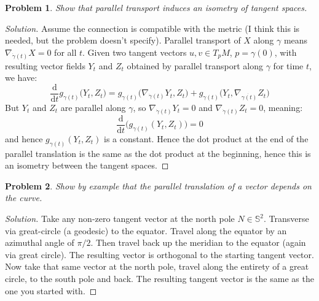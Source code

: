 \documentclass{article}
\theoremstyle{normal}
\newtheorem{problem}{Problem}
\begin{document}
    \begin{problem}
        Show that parallel transport induces an isometry of tangent spaces.
    \end{problem}
    \begin{proof}[Solution]
        Assume the connection is compatible with the metric (I think this is
        needed, but the problem doesn't specify). Parallel transport of
        $X$ along $\gamma$ means $\nabla_{\dot{\gamma}(t)}X=0$ for all $t$.
        Given two tangent vectors $u,v\in{T}_{p}M$, $p=\gamma(0)$, with
        resulting vector fields $Y_{t}$ and $Z_{t}$ obtained by parallel
        transport along $\gamma$ for time $t$, we have:
        \begin{equation}
            \frac{\textrm{d}}{\textrm{d}t}g_{\gamma(t)}\big(
                Y_{t},Z_{t}
            \big)=g_{\gamma(t)}\big(\nabla_{\dot{\gamma}(t)}Y_{t},Z_{t}\big)+
                g_{\gamma(t)}\big(Y_{t},\nabla_{\dot{\gamma(t)}}Z_{t}\big)
        \end{equation}
        But $Y_{t}$ and $Z_{t}$ are parallel along $\gamma$, so
        $\nabla_{\dot{\gamma}(t)}Y_{t}=0$ and
        $\nabla_{\dot{\gamma}(t)}Z_{t}=0$, meaning:
        \begin{equation}
            \frac{\textrm{d}}{\textrm{d}t}\Big(
                g_{\gamma(t)}(Y_{t},Z_{t})\Big)=0
        \end{equation}
        and hence $g_{\gamma(t)}(Y_{t},Z_{t})$ is a constant. Hence the dot
        product at the end of the parallel translation is the same as the dot
        product at the beginning, hence this is an isometry between the tangent
        spaces.
    \end{proof}
    \begin{problem}
        Show by example that the parallel translation of a vector depends on
        the curve.
    \end{problem}
    \begin{proof}[Solution]
        Take any non-zero tangent vector at the north pole $N\in\mathbb{S}^{2}$.
        Transverse via great-circle (a geodesic) to the equator. Travel along
        the equator by an azimuthal angle of $\pi/2$. Then travel back up the
        meridian to the equator (again via great circle). The resulting vector
        is orthogonal to the starting tangent vector. Now take that same vector
        at the north pole, travel along the entirety of a great circle, to the
        south pole and back. The resulting tangent vector is the same as the
        one you started with.
    \end{proof}
\end{document}

